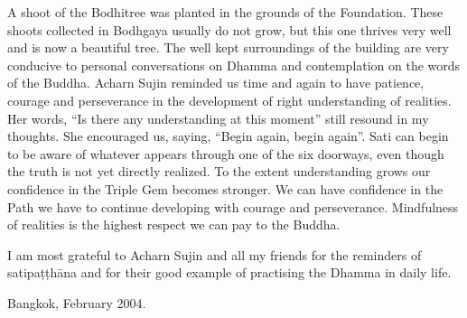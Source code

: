 A shoot of the Bodhitree was planted in the grounds of the Foundation. These shoots collected in Bodhgaya usually do not grow, but this one thrives very well and is now a beautiful tree. The well kept surroundings of the building are very conducive to personal conversations on Dhamma and contemplation on the words of the Buddha.
Acharn Sujin reminded us time and again to have patience, courage and perseverance in the development of right understanding of realities. Her words, ``Is there any understanding at this moment'' still resound in my thoughts. She encouraged us, saying, ``Begin again, begin again''. Sati can begin to be aware of whatever appears through one of the six doorways, even though the truth is not yet directly realized.
To the extent understanding grows our confidence in the Triple Gem becomes stronger. We can have confidence in the Path we have to continue developing with courage and perseverance. Mindfulness of realities is the highest respect we can pay to the Buddha.

I am most grateful to Acharn Sujin and all my friends for the reminders of satipaṭṭhāna and for their good example of practising the Dhamma in daily life.

Bangkok,
February 2004.








